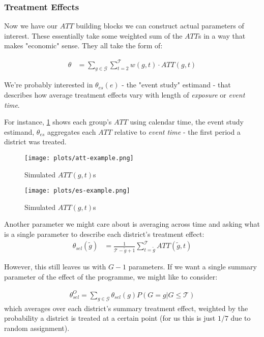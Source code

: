 \documentclass{article}
\begin{document}
  \subsubsection*{Treatment Effects} 
   Now we have our $ATT$ building blocks we can construct actual parameters of
   interest. These essentially take some weighted sum of the $ATT$s in a way that 
   makes "economic" sense. They all take the form of:

   \begin{align*}
      \theta &= \sum_{g \in \mathcal{G}}\sum_{t=2}^\mathcal{T} w(g,t)\cdot ATT(g,t)
   \end{align*}

   We're probably interested in $\theta_{es}(e)$ - the "event study" estimand - that 
   describes how average treatment effects vary with length of \textit{exposure} or 
   \textit{event time}.

   For instance,  \ref{fig:att} shows each group's $ATT$ using calendar time, 
   the event study estimand, $\theta_{es}$ aggregates each $ATT$ relative to 
   \textit{event time} - the first period a district was treated. 


   \begin{figure}[htbp]
      \centering
     \texttt{[image: plots/att-example.png]} 
      \caption{Simulated $ATT(g,t)$s}
      \label{fig:att}
   \end{figure}

   \begin{figure}[htbp]
      \centering
     \texttt{[image: plots/es-example.png]} 
      \caption{Simulated $ATT(g,t)$s}
      \label{fig:es}
   \end{figure}

   Another parameter we might care about is averaging across time and asking 
   what is a single parameter to describe each district's treatment effect:
   \begin{align*}
      \theta_{sel}(\tilde{g}) &= \frac{1}{\mathcal{T} - \tilde{g} + 1} \sum_{t = \tilde{g}}^\mathcal{T} ATT(\tilde{g}, t)
   \end{align*}

   However, this still leaves us with $G-1$ parameters. If we want a single 
   summary parameter of the effect of the programme, we might like to consider:

   \begin{align*}
      \theta_{sel}^O = \sum_{g \in \mathcal{G}} \theta_{sel}(g) P(G = g | G \leq \mathcal{T})
   \end{align*}
   which averages over each district's summary treatment effect, weighted by the 
   probability a district is treated at a certain point (for us this is just $1/7$ 
   due to random assignment).
\end{document}
